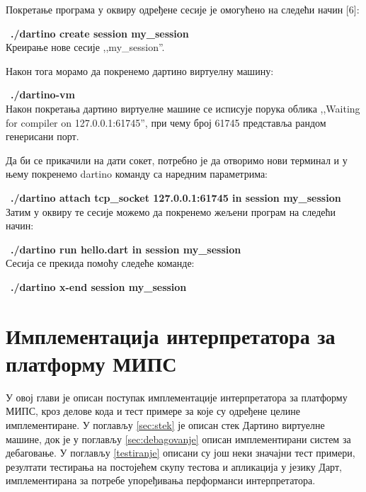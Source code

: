 \documentclass[12pt,oneside]{memoir}
\begin{document}
Покретање програма у оквиру одређене сесије је омогућено на следећи начин [6]:

~\textbf{./dartino create session my\_session}\\
Креирање нове сесије ,,my\_session''.

Након тога морамо да покренемо дартино виртуелну машину:

~\textbf{./dartino-vm}\\
Након покретања дартино виртуелне машине се исписује порука облика ,,Waiting for compiler on 127.0.0.1:61745'', при чему број 61745 представља рандом генерисани порт.

Да би се прикачили на дати сокет, потребно је да отворимо нови терминал и у њему покренемо dartino команду са наредним параметрима:

~\textbf{./dartino attach tcp\_socket 127.0.0.1:61745 in session my\_session}\\

Затим у оквиру те сесије можемо да покренемо жељени програм на следећи начин:

~\textbf{./dartino run hello.dart in session my\_session}\\

Сесија се прекида помоћу следеће команде:

~\textbf{./dartino x-end session my\_session}\\


\chapter{Имплементација интерпретатора за платформу МИПС}
\label{chp:implementacija}
У овој глави је описан поступак имплементације интерпретатора за платформу МИПС, кроз делове кода и тест примере за које су одређене целине имплементиране. У поглављу \ref{sec:stek} је описан стек Дартино виртуелне машине, док је у поглављу \ref{sec:debagovanje} описан имплементирани систем за дебаговање. У поглављу \ref{testiranje} описани су још неки значајни тест примери, резултати тестирања на постојећем скупу тестова и апликација у језику Дарт, имплементирана за потребе упоређивања перформанси интерпретатора.
\end{document}
